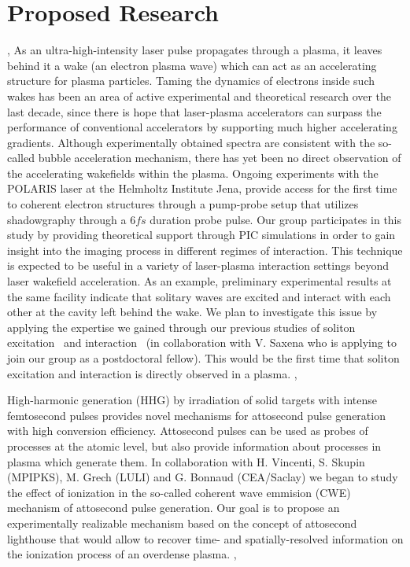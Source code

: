 \documentclass[11pt,a4paper,final]{moderncv}
\begin{document}
\section{Proposed Research}
\sep
{}
As an ultra-high-intensity laser pulse propagates through a plasma, it leaves behind it a wake (an electron plasma wave) which can act as an accelerating
structure for plasma particles. Taming the dynamics of electrons inside such wakes has been an area of active experimental and theoretical research over 
the last decade, since there is hope that laser-plasma accelerators can surpass the performance of conventional accelerators by supporting 
much higher accelerating gradients. Although experimentally obtained spectra are consistent with the so-called bubble acceleration mechanism,
there has yet been no direct observation of the accelerating wakefields within the plasma. Ongoing experiments with the POLARIS laser at the
Helmholtz Institute Jena, provide access for the first time to coherent electron structures through a pump-probe setup that utilizes shadowgraphy 
through a $6fs$ duration probe pulse. Our group participates in this study by providing theoretical support through PIC simulations in order to
gain insight into the imaging process in different regimes of interaction. This technique is expected to be useful in a variety of 
laser-plasma interaction settings beyond laser wakefield acceleration. As an example, preliminary experimental results at the same facility indicate that solitary waves 
are excited and interact with each other at the cavity left behind the wake. We plan to investigate this issue by applying the expertise we gained through
our previous studies of soliton excitation~\cite{SSL10,SSL10-1} and interaction~\cite{saxena2013} (in collaboration with V. Saxena who is applying to join our group as a postdoctoral fellow).
This would be the first time that soliton excitation and interaction is directly observed in a plasma.
\sep


High-harmonic generation (HHG) by irradiation of solid targets with intense femtosecond pulses provides novel mechanisms for attosecond pulse
generation with high conversion efficiency. Attosecond pulses can be used as probes of processes at the atomic level, but also provide information
about processes in plasma which generate them. In collaboration with H. Vincenti, S. Skupin (MPIPKS), M. Grech (LULI) and G. Bonnaud (CEA/Saclay) 
we began to study the effect of ionization in the so-called coherent wave emmision (CWE) mechanism of attosecond pulse generation. Our goal is
to propose an experimentally realizable mechanism based on the concept of attosecond lighthouse that would allow to recover time- and spatially-resolved
information on the ionization process of an overdense plasma.
\sep
\end{document}
